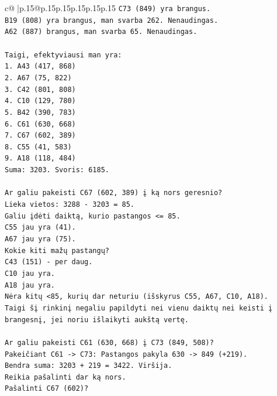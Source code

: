 \documentclass{article}
\begin{document}
{\begin{supertabular}{c@{$\;$}|p{.15\linewidth}@{}p{.15\linewidth}p{.15\linewidth}p{.15\linewidth}p{.15\linewidth}p{.15\linewidth}}
{{{\texttt{C73 (849) yra brangus.} \\
\texttt{B19 (808) yra brangus, man svarba 262. Nenaudingas.} \\
\texttt{A62 (887) brangus, man svarba 65. Nenaudingas.} \\
\\ 
\texttt{Taigi, efektyviausi man yra:} \\
\texttt{1. A43 (417, 868)} \\
\texttt{2. A67 (75, 822)} \\
\texttt{3. C42 (801, 808)} \\
\texttt{4. C10 (129, 780)} \\
\texttt{5. B42 (390, 783)} \\
\texttt{6. C61 (630, 668)} \\
\texttt{7. C67 (602, 389)} \\
\texttt{8. C55 (41, 583)} \\
\texttt{9. A18 (118, 484)} \\
\texttt{Suma: 3203. Svoris: 6185.} \\
\\ 
\texttt{Ar galiu pakeisti C67 (602, 389) į ką nors geresnio?} \\
\texttt{Lieka vietos: 3288 {-} 3203 = 85.} \\
\texttt{Galiu įdėti daiktą, kurio pastangos <= 85.} \\
\texttt{C55 jau yra (41).} \\
\texttt{A67 jau yra (75).} \\
\texttt{Kokie kiti mažų pastangų?} \\
\texttt{C43 (151) {-} per daug.} \\
\texttt{C10 jau yra.} \\
\texttt{A18 jau yra.} \\
\texttt{Nėra kitų <85, kurių dar neturiu (išskyrus C55, A67, C10, A18).} \\
\texttt{Taigi šį rinkinį negaliu papildyti nei vienu daiktų nei keisti į brangesnį, jei noriu išlaikyti aukštą vertę.} \\
\\ 
\texttt{Ar galiu pakeisti C61 (630, 668) į C73 (849, 508)?} \\
\texttt{Pakeičiant C61 {-}> C73: Pastangos pakyla 630 {-}> 849 (+219).} \\
\texttt{Bendra suma: 3203 + 219 = 3422. Viršija.} \\
\texttt{Reikia pašalinti dar ką nors.} \\
\texttt{Pašalinti C67 (602)?} \\
}}}
\end{supertabular}}
\end{document}
